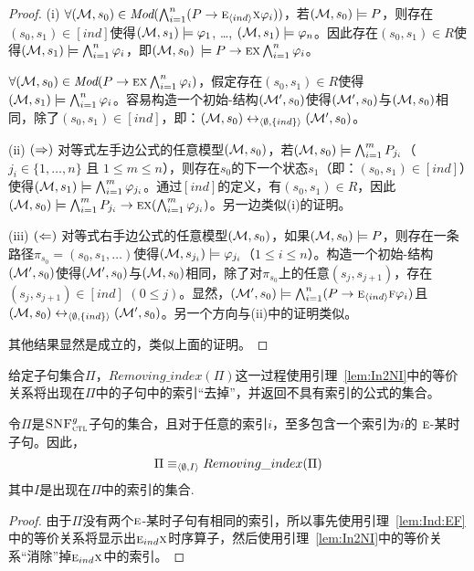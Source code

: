 \begin{proof}
	(i) $\forall ({\cal M}, s_0) \in \textit{Mod}(\bigwedge_{i=1}^n (P\rightarrow \textsc{e}_{{\langle{ind}\rangle}} \textsc{x} \varphi_i))$，若$({\cal M}, s_0) \models P$，则存在$(s_0, s_1)\in [ind]$使得$({\cal M}, s_1) \models \varphi_1$, \dots, $({\cal M}, s_1) \models \varphi_n$。因此存在$(s_0, s_1)\in R$使得$({\cal M}, s_1) \models \bigwedge_{i=1}^n \varphi_i$，即$({\cal M}, s_0)$ $\models P\rightarrow \textsc{e} \textsc{x} \bigwedge_{i=1}^n \varphi_i$。
	
	$\forall ({\cal M}, s_0) \in \textit{Mod}(P\rightarrow \textsc{e} \textsc{x} \bigwedge_{i=1}^n \varphi_i)$，假定存在$(s_0, s_1)\in R$使得$({\cal M}, s_1) \models \bigwedge_{i=1}^n \varphi_i$。容易构造一个初始\Ind-结构$({\cal M}', s_0)$使得$({\cal M}', s_0)$与$({\cal M}, s_0)$相同，除了$(s_0, s_1) \in [ind]$，即：$({\cal M}, s_0) \leftrightarrow_{{\langle{\emptyset, \{ind\}}\rangle}} ({\cal M}', s_0)$。
	
	(ii) $(\Rightarrow)$ 对等式左手边公式的任意模型$({\cal M},s_0)$，若$({\cal M},s_0) \models \bigwedge_{i=1}^m P_{j_i}$（$j_i \in \{1, \dots, n\}$ 且 $1\leq m \leq n$），则存在$s_0$的下一个状态$s_1$（即：$(s_0, s_1) \in [ind]$）使得$({\cal M}, s_1) \models \bigwedge_{i=1}^m \varphi_{j_i}$。通过$[ind]$的定义，有$(s_0, s_1) \in R$，因此$({\cal M}, s_0) \models \bigwedge_{i=1}^m P_{j_i} \rightarrow \textsc{e} \textsc{x} (\bigwedge_{i=1}^m \varphi_{j_i})$。另一边类似(i)的证明。%
	
	(iii) $(\Leftarrow)$ 对等式右手边公式的任意模型$({\cal M},s_0)$，如果$({\cal M},s_0) \models P$，则存在一条路径$\pi_{s_0} = (s_0, s_1, \dots)$使得$ ({\cal M}, s_{j_i}) \models \varphi_{j_i}$（$1\leq i \leq n$）。构造一个初始\Ind-结构$({\cal M}', s_0)$使得$({\cal M}', s_0)$与$({\cal M}, s_0)$相同，除了对$\pi_{s_0}$上的任意$(s_j, s_{j+1})$，存在$(s_j, s_{j+1}) \in [ind]$ $(0\leq j)$。显然，$({\cal M}', s_0) \models \bigwedge_{i=1}^n (P\rightarrow \textsc{e}_{{\langle{ind}\rangle}} \textsc{f} \varphi_i)$且$({\cal M}, s_0) \leftrightarrow_{{\langle{\emptyset, \{ind\}}\rangle}} ({\cal M}', s_0)$。另一个方向与(ii)中的证明类似。
	
	其他结果显然是成立的，类似上面的证明。
\end{proof}

给定子句集合$\Pi$，$Removing\_index(\Pi)$这一过程使用引理~\ref{lem:In2NI}中的等价关系将出现在$\Pi$中的子句中的索引“去掉”，并返回不具有索引的公式的集合。
\begin{proposition}\label{lem:No:Ind}
	令$\Pi$是${\textsc{SNF}_{\textsc{ctl}}^g}$子句的集合，且对于任意的索引$i$，至多包含一个索引为$i$的
	$\textsc{e}$-某时子句。因此，$$\Pi\equiv_{{\langle{\emptyset, I}\rangle}}  Removing\_index(\Pi)$$
	其中$I$是出现在$\Pi$中的索引的集合.
\end{proposition}
\begin{proof}
	由于$\Pi$没有两个$\textsc{e}$-某时子句有相同的索引，所以事先使用引理~\ref{lem:Ind:EF}中的等价关系将显示出$\textsc{e}_{ind}\textsc{x}$时序算子，然后使用引理~\ref{lem:In2NI}中的等价关系“消除”掉$\textsc{e}_{ind}\textsc{x}$中的索引。
\end{proof}


